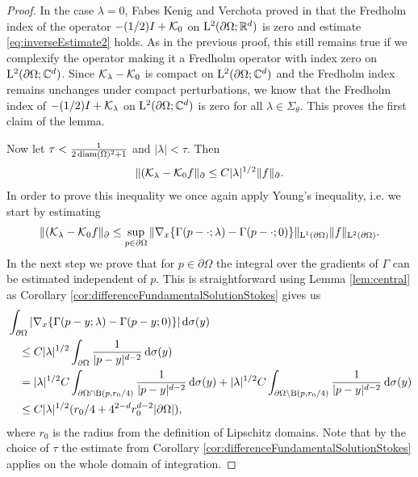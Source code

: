\begin{proof}
  In the case $\lambda = 0$, Fabes Kenig and Verchota proved in \cite{fabesKenigVerchota} that the Fredholm index of the operator $-(1/2)I + \mathcal{K}_0$ on $\mathrm{L}^2(\partial\Omega; \mathbb{R}^d)$ is zero and estimate \eqref{eq:inverseEstimate2} holds.
  As in the previous proof, this still remains true if we complexify the operator making it a Fredholm operator with index zero on  $\mathrm{L}^2(\partial\Omega; \mathbb{C}^d)$.
  Since $\mathcal{K}_\lambda - \mathcal{K}_0$ is compact on $\mathrm{L}^2(\partial\Omega; \mathbb{C}^d)$ and the Fredholm index remains unchanges under compact perturbations, we know that the Fredholm index of $-(1/2)I + \mathcal{K}_\lambda$ on $\mathrm{L}^2(\partial\Omega; \mathbb{C}^d)$ is zero for all $\lambda \in \Sigma_\theta$.
  This proves the first claim of the lemma.

  Now let $\tau < \frac{1}{2 \operatorname{diam}(\Omega)^2 + 1}$ and $|\lambda| < \tau$.
  Then
  \begin{align*}
    \| (\mathcal{K}_\lambda - \mathcal{K}_0 f\|_\partial \leq C |\lambda|^{1/2} \|f\|_\partial.
  \end{align*}
  In order to prove this inequality we once again apply Young's inequality, i.e. we start by estimating
  \begin{align*}
    \| (\mathcal{K}_\lambda - \mathcal{K}_0 f\|_\partial \leq \sup_{p \in \partial\Omega} \| \nabla_x \{ \Gamma(p - \cdot; \lambda) - \Gamma(p - \cdot; 0) \} \|_{\mathrm{L}^1(\partial\Omega)} \| f\|_{\mathrm{L}^2(\partial\Omega)}.
  \end{align*}
  In the next step we prove that for $p \in \partial\Omega$ the integral over the gradients of $\Gamma$ can be estimated independent of $p$.
  This is straightforward using Lemma \ref{lem:central} as Corollary \ref{cor:differenceFundamentalSolutionStokes} gives us
  \begin{align*}
    &\int_{\partial\Omega} | \nabla_x \{ \Gamma(p - y; \lambda) - \Gamma(p - y; 0) \} | \, {\operatorname{d}\!{\sigma}}(y)\\
    &\quad\leq C |\lambda|^{1/2} \int_{\partial\Omega} \frac{1}{|p - y|^{d - 2}} \, {\operatorname{d}\!{\sigma}}(y) \\
    &\quad= |\lambda|^{1/2} C \int_{\partial\Omega \cap \mathrm{B}(p, r_0/4)} \frac{1}{|p - y|^{d - 2}} \, {\operatorname{d}\!{\sigma}}(y) + |\lambda|^{1/2} C \int_{\partial\Omega \setminus \mathrm{B}(p, r_0/4)} \frac{1}{|p - y|^{d - 2}} \, {\operatorname{d}\!{\sigma}}(y) \\
    &\quad\leq C |\lambda|^{1/2} ( r_0/4 + 4^{2 - d} r_0^{d - 2} |\partial\Omega| ),
  \end{align*}
  where $r_0$ is the radius from the definition of Lipschitz domains. 
  Note that by the choice of $\tau$ the estimate from Corollary \ref{cor:differenceFundamentalSolutionStokes} applies on the whole domain of integration.


\end{proof}
